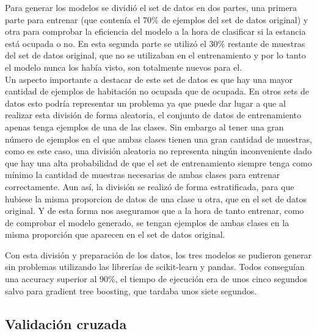 \documentclass[a4paper, 12pt]{book}
\begin{document}
Para generar los modelos se dividió el set de datos en dos partes, una primera parte para entrenar (que contenía el 70\% de ejemplos del set de datos original) y otra para comprobar la eficiencia del modelo a la hora de clasificar si la estancia está ocupada o no. En esta segunda parte se utilizó el 30\% restante de muestras del set de datos original, que no se utilizaban en el entrenamiento y por lo tanto el modelo nunca los había visto, son totalmente nuevos para el.\\
Un aspecto importante a destacar de este set de datos es que hay una mayor cantidad de ejemplos de habitación no ocupada que de ocupada. En otros sets de datos esto podría representar un problema ya que puede dar lugar a que al realizar esta división de forma aleatoria, el conjunto de datos de entrenamiento apenas tenga ejemplos de una de las clases. Sin embargo al tener una gran número de ejemplos en el que ambas clases tienen una gran cantidad de muestras, como es este caso, una división aleatoria no representa ningún inconveniente dado que hay una alta probabilidad de que el set de entrenamiento siempre tenga como mínimo la cantidad de muestras necesarias de ambas clases para entrenar correctamente. Aun así, la división se realizó de forma estratificada, para que hubiese la misma proporcion de datos de una clase u otra, que en el set de datos original. Y de esta forma nos aseguramos que a la hora de tanto entrenar, como de comprobar el modelo generado, se tengan ejemplos de ambas clases en la misma proporción que aparecen en el set de datos original.

Con esta división y preparación de los datos, los tres modelos se pudieron generar sin problemas utilizando las librerías de scikit-learn y pandas. Todos conseguían una accuracy superior al 90\%, el tiempo de ejecución era de unos cinco segundos salvo para gradient tree boosting, que tardaba unos siete segundos.

\subsection{Validación cruzada}
\end{document}
